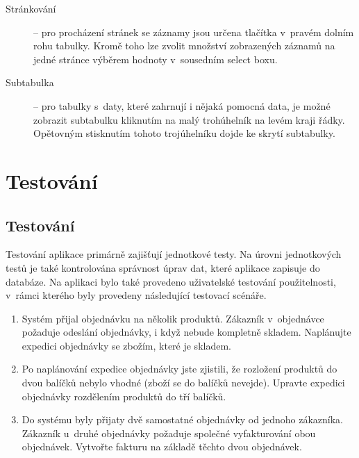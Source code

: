 \documentclass[thesis=B,czech]{FITthesis}[2012/06/26]
\begin{document}
\begin{description}
		\item[Stránkování] -- pro procházení stránek se záznamy jsou určena tlačítka v~pravém dolním rohu tabulky. Kromě toho lze zvolit množství zobrazených záznamů na jedné stránce výběrem hodnoty v~sousedním select boxu.
		\item[Subtabulka] -- pro tabulky s~daty, které zahrnují i nějaká pomocná data, je možné zobrazit subtabulku kliknutím na malý trohúhelník na levém kraji řádky. Opětovným stisknutím tohoto trojúhelníku dojde ke skrytí subtabulky.
	\end{description}

\chapter{Testování}

\section{Testování}
	Testování aplikace primárně zajišťují jednotkové testy. Na úrovni jednotkových testů je také kontrolována správnost úprav dat, které aplikace zapisuje do databáze. Na aplikaci bylo také provedeno uživatelské testování použitelnosti, v~rámci kterého byly provedeny následující testovací scénáře.
	\begin{enumerate}
		\item Systém přijal objednávku na několik produktů. Zákazník v~objednávce požaduje odeslání objednávky, i když nebude kompletně skladem. Naplánujte expedici objednávky se zbožím, které je skladem. %
		\item Po naplánování expedice objednávky jste zjistili, že rozložení produktů do dvou balíčků nebylo vhodné (zboží se do balíčků nevejde). Upravte expedici objednávky rozdělením produktů do tří balíčků.
		\item Do systému byly přijaty dvě samostatné objednávky od jednoho zákazníka. Zákazník u~druhé objednávky požaduje společné vyfakturování obou objednávek. Vytvořte fakturu na základě těchto dvou objednávek.
	\end{enumerate}
\end{document}
